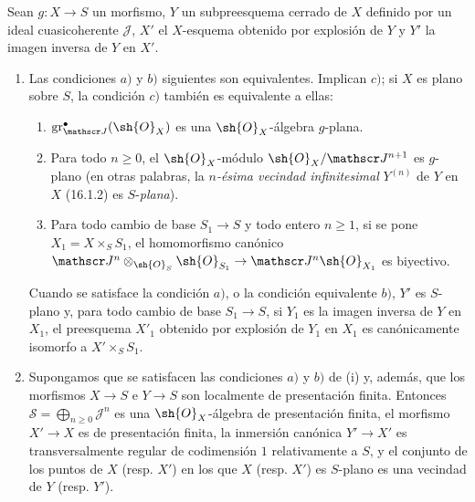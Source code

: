 \begin{proposition}[19.4.6]
\label{IV.19.4.6}
Sean $g:X\to S$ un morfismo, $Y$ un subpreesquema cerrado de $X$ definido por un ideal cuasicoherente $\mathscr J$, $X'$ el $X$-esquema obtenido por explosión de $Y$ y $Y'$ la imagen inversa de $Y$ en $X'$.
\begin{enumerate}
  \item[\textup{(i)}] Las condiciones $a)$ y $b)$ siguientes son equivalentes. Implican $c)$; si $X$ es plano sobre $S$, la condición $c)$ también es equivalente a ellas:
  \begin{enumerate}
    \item[\textup{a)}] $\operatorname{gr}_{\mathscr J}^\bullet(\sh{O}_X)$ es una $\sh{O}_X$-álgebra $g$-plana.
    \item[\textup{b)}] Para todo $n\geq0$, el $\sh{O}_X$-módulo $\sh{O}_X/\mathscr J^{n+1}$ es $g$-plano \textup{(en otras palabras, la \emph{$n$-ésima vecindad infinitesimal} $Y^{(n)}$ de $Y$ en $X$ (16.1.2) es $S$-\emph{plana})}.
    \item[\textup{c)}] Para todo cambio de base $S_1\to S$ y todo entero $n\geq1$, si se pone $X_1=X\times_S S_1$, el homomorfismo canónico $\mathscr J^n\otimes_{\sh{O}_S}\sh{O}_{S_1}\to\mathscr J^n\sh{O}_{X_1}$ es biyectivo.
  \end{enumerate}
  Cuando se satisface la condición $a)$, o la condición equivalente $b)$, $Y'$ es $S$-plano y, para todo cambio de base $S_1\to S$, si $Y_1$ es la imagen inversa de $Y$ en $X_1$, el preesquema $X'_1$ obtenido por explosión de $Y_1$ en $X_1$ es canónicamente isomorfo a $X'\times_S S_1$.
  \item[\textup{(ii)}] Supongamos que se satisfacen las condiciones $a)$ y $b)$ de \textup{(i)} y, además, que los morfismos $X\to S$ e $Y\to S$ son localmente de presentación finita. Entonces $\mathscr S=\bigoplus_{n\geq0}\mathscr J^n$ es una $\sh{O}_X$-álgebra de presentación finita, el morfismo $X'\to X$ es de presentación finita, la inmersión canónica $Y'\to X'$ es transversalmente regular de codimensión $1$ relativamente a $S$, y el conjunto de los puntos de $X$ \textup{(resp. $X'$)} en los que $X$ \textup{(resp. $X'$)} es $S$-plano es una vecindad de $Y$ \textup{(resp. $Y'$)}.
\end{enumerate}
\end{proposition}

